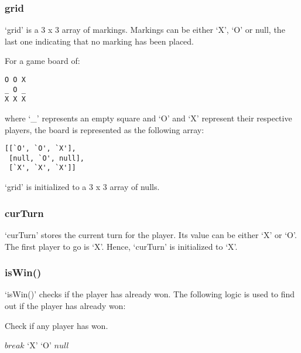 \documentclass{article}
\newcommand{\qt}[1]{\mbox{`#1'}}
\begin{document}
\subsubsection{grid}

`grid' is a 3 x 3 array of markings. Markings can be either `X', `O' or null, the last one indicating that no marking has been placed.

For a game board of:

\begin{verbatim}
O O X
_ O _
X X X
\end{verbatim}

where `\_' represents an empty square and `O' and `X' represent their respective players, the board is represented as the following array:

\begin{verbatim}
[[`O', `O', `X'],
 [null, `O', null],
 [`X', `X', `X']]
\end{verbatim}

`grid' is initialized to a 3 x 3 array of nulls.

\subsubsection{curTurn}

`curTurn' stores the current turn for the player. Its value can be either `X' or `O'. The first player to go is `X'. Hence, `curTurn' is initialized to `X'.

\subsubsection{isWin()}

`isWin()' checks if the player has already won. The following logic is used to find out if the player has already won:

\begin{algorithm}
\caption{Check if any player has won.}

\begin{algorithmic}[1]
        $break$
      \EndIf
    \EndFor
    \If{$seq[0] = \qt{X}$}
      \Return $\qt{X}$
    \ElsIf{$seq[0] = \qt{O}$}
      \Return $\qt{O}$
    \EndIf
  \EndFor
  \Return $null$
\EndProcedure
\end{algorithmic}
\end{algorithm}
\end{document}
